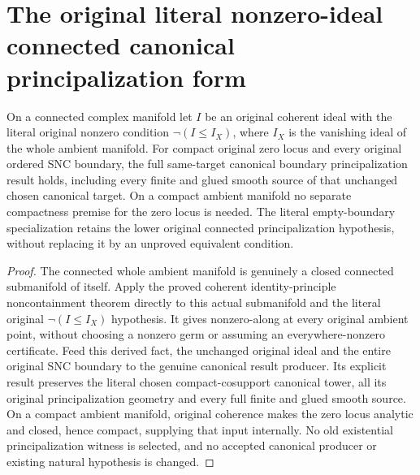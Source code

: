 \section{The original literal nonzero-ideal connected canonical principalization form}
\label{sec:hironaka-original-nonzero-canonical-principalization}

\begin{theorem}
\label{hir:original-literal-nonzero-canonical-principalization}
On a connected complex manifold let $I$ be an original coherent ideal
with the literal original nonzero condition
$\neg(I\le I_X)$, where $I_X$ is the vanishing ideal of the whole
ambient manifold. For compact original zero locus and every original
ordered SNC boundary, the full same-target canonical boundary
principalization result holds, including every finite and glued smooth
source of that unchanged chosen canonical target. On a compact ambient
manifold no separate compactness premise for the zero locus is needed.
The literal empty-boundary specialization retains the lower original
connected principalization hypothesis, without replacing it by an
unproved equivalent condition.
\leanok
\end{theorem}
\begin{proof}
The connected whole ambient manifold is genuinely a closed connected
submanifold of itself. Apply the proved coherent identity-principle
noncontainment theorem directly to this actual submanifold and the
literal original $\neg(I\le I_X)$ hypothesis. It gives nonzero-along
at every original ambient point, without choosing a nonzero germ or
assuming an everywhere-nonzero certificate. Feed this derived fact,
the unchanged original ideal and the entire original SNC boundary to
the genuine canonical result producer. Its explicit result preserves
the literal chosen compact-cosupport canonical tower, all its original
principalization geometry and every full finite and glued smooth
source. On a compact ambient manifold, original coherence makes the
zero locus analytic and closed, hence compact, supplying that input
internally. No old existential principalization witness is selected,
and no accepted canonical producer or existing natural hypothesis is
changed.
\end{proof}
